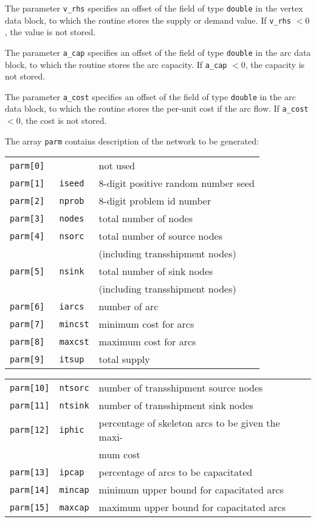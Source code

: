 The parameter \verb|v_rhs| specifies an offset of the field of type
\verb|double| in the vertex data block, to which the routine stores the
supply or  demand value. If \verb|v_rhs| $<0$, the value is not stored.

The parameter \verb|a_cap| specifies an offset of the field of type
\verb|double| in the arc data block, to which the routine stores the
arc capacity. If \verb|a_cap| $<0$, the capacity is not stored.

The parameter \verb|a_cost| specifies an offset of the field of type
\verb|double| in the arc data block, to which the routine stores the
per-unit cost if the arc flow. If \verb|a_cost| $<0$, the cost is not
stored.

The array \verb|parm| contains description of the network to be
generated:

\begin{tabular}{@{}lll@{}}
\verb|parm[0] |&             &not used\\
\verb|parm[1] |&\verb|iseed |&8-digit positive random number seed\\
\verb|parm[2] |&\verb|nprob |&8-digit problem id number\\
\verb|parm[3] |&\verb|nodes |&total number of nodes\\
\verb|parm[4] |&\verb|nsorc |&total number of source nodes\\
&&(including transshipment nodes)\\
\verb|parm[5] |&\verb|nsink |&total number of sink nodes\\
&&(including transshipment nodes)\\
\verb|parm[6] |&\verb|iarcs |&number of arc\\
\verb|parm[7] |&\verb|mincst|&minimum cost for arcs\\
\verb|parm[8] |&\verb|maxcst|&maximum cost for arcs\\
\verb|parm[9] |&\verb|itsup |&total supply\\
\end{tabular}

\begin{tabular}{@{}lll@{}}
\verb|parm[10]|&\verb|ntsorc|&number of transshipment source nodes\\
\verb|parm[11]|&\verb|ntsink|&number of transshipment sink nodes\\
\verb|parm[12]|&\verb|iphic |&percentage of skeleton arcs to be given
the maxi-\\&&mum cost\\
\verb|parm[13]|&\verb|ipcap |&percentage of arcs to be capacitated\\
\verb|parm[14]|&\verb|mincap|&minimum upper bound for capacitated arcs\\
\verb|parm[15]|&\verb|maxcap|&maximum upper bound for capacitated arcs\\
\end{tabular}

